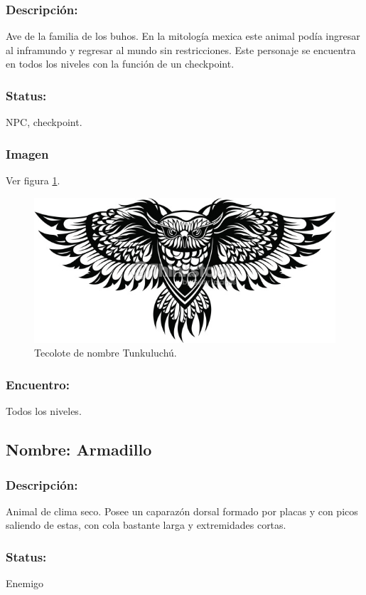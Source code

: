 \documentclass[11pt,letterpaper]{article}
\begin{document}
\subsubsection{Descripción:}
Ave de la familia de los buhos. En la mitología mexica este animal podía ingresar al inframundo y regresar al mundo sin restricciones. Este personaje se encuentra en todos los niveles con la función de un checkpoint.
\subsubsection{Status:}
NPC, checkpoint.
\subsubsection{Imagen}
Ver figura \ref{fig:tecolote}.
\begin{figure}
	\centering
	\includegraphics[height=0.2 \textheight]{Imagenes/tecolote}
	\caption{Tecolote de nombre Tunkuluchú.}
	\label{fig:tecolote}
\end{figure}
\subsubsection{Encuentro:}
Todos los niveles.
\subsection{Nombre: Armadillo}  \label{per.armadillo} 
\subsubsection{Descripción:}
Animal de clima seco. Posee un caparazón dorsal formado por placas y con picos saliendo de estas, con cola bastante larga y extremidades cortas.
\subsubsection{Status:}
Enemigo
\end{document}
